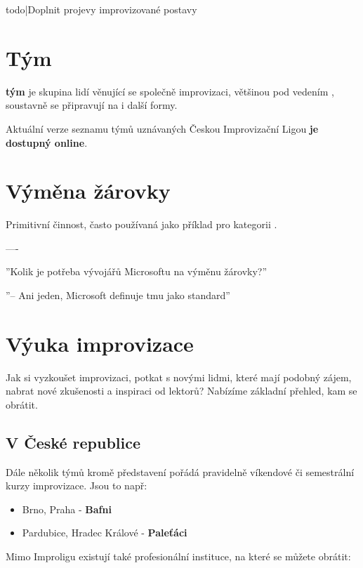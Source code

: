 {{todo|Doplnit projevy improvizované postavy}} 
\needspace{5cm} \section{Tým} \label{tým}  \textbf{tým}{} je skupina lidí věnující se společně improvizaci, většinou pod vedením , soustavně se připravují na  i další formy. 
 
Aktuální verze seznamu týmů uznávaných  Českou Improvizační Ligou  \textbf{je dostupný online}. 
\needspace{5cm} \section{Výměna žárovky} \label{výměna žárovky} Primitivní činnost, často používaná jako příklad pro kategorii . 
 
 
---- 
 
 
''Kolik je potřeba vývojářů Microsoftu na výměnu žárovky?'' 
 
''-- Ani jeden, Microsoft definuje tmu jako standard'' 
\needspace{5cm} \section{Výuka improvizace} \label{výuka improvizace} Jak si vyzkoušet improvizaci, potkat s novými lidmi, které mají podobný zájem, nabrat nové zkušenosti a inspiraci od lektorů? Nabízíme základní přehled, kam se obrátit. 
 
\subsection{ V České republice }  
Dále několik  týmů kromě představení pořádá pravidelně víkendové či semestrální kurzy improvizace. 
Jsou to např: 
\begin{itemize}
\item  Brno, Praha - \textbf{Bafni}
\item  Pardubice, Hradec Králové - \textbf{Paleťáci}
\end{itemize}
 
Mimo Improligu existují také profesionální instituce, na které se můžete obrátit: 
 
